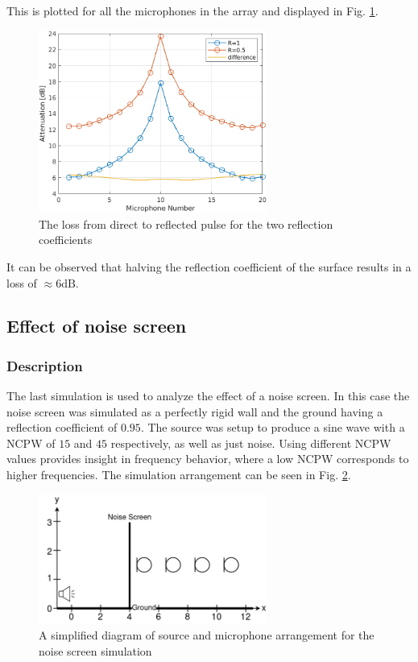 \documentclass[twocolumn]{article}
\begin{document}
This is plotted for all the microphones in the array and displayed in Fig. \ref{fig_3_2_plot}.

\begin{figure}[H]
    \centering
    \includegraphics[width=75mm]{./Images/3_2_2D.png}
    \caption{The loss from direct to reflected pulse for the two reflection coefficients}
    \label{fig_3_2_plot}
\end{figure}

It can be observed that halving the reflection coefficient of the surface results in
a loss of $\approx 6\text{dB}$.


\subsection{Effect of noise screen}
\subsubsection{Description}
The last simulation is used to analyze the effect of a noise screen.
In this case the noise screen was simulated as a perfectly rigid wall and
the ground having a reflection coefficient of $0.95$.
The source was setup to produce a sine wave with a NCPW of $15$ and $45$ respectively,
as well as just noise.
Using different NCPW values provides insight in frequency behavior, where a low NCPW
corresponds to higher frequencies.
The simulation arrangement can be seen in Fig. \ref{fig_3_3_example}.

\begin{figure}[H]
    \centering
    \includegraphics[width=75mm]{./Images/tlmfig_3_3.png}
    \caption{A simplified diagram of source and microphone arrangement for the noise screen simulation}
    \label{fig_3_3_example}
\end{figure}
\end{document}
